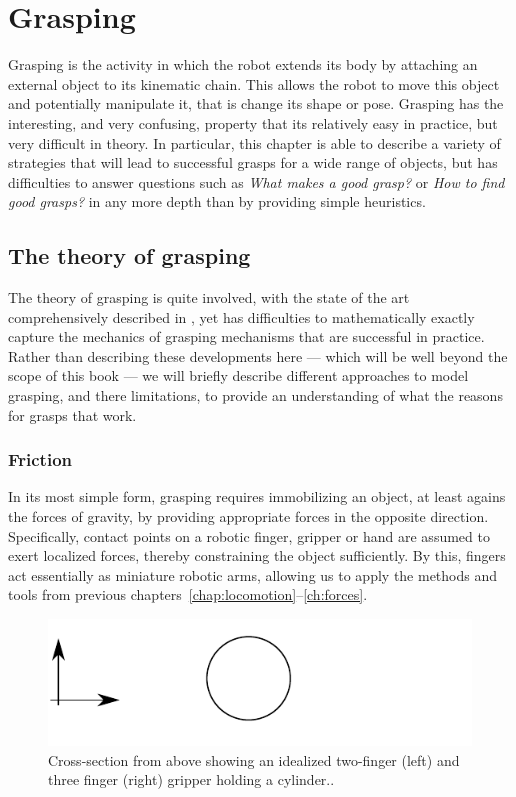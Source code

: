\chapter{Grasping}
Grasping is the activity in which the robot extends its body by attaching an external object to its kinematic chain. This allows the robot to move this object and potentially manipulate it, that is change its shape or pose. Grasping has the interesting, and very confusing, property that its relatively easy in practice, but very difficult in theory. In particular, this chapter is able to describe a variety of strategies that will lead to successful grasps for a wide range of objects, but has difficulties to answer questions such as \emph{What makes a good grasp?} or \emph{How to find good grasps?} in any more depth than by providing simple heuristics.

\section{The theory of grasping}
The theory of grasping is quite involved, with the state of the art comprehensively described in \cite{rimon2019mechanics}, yet has difficulties to mathematically exactly capture the mechanics of grasping mechanisms that are successful in practice. Rather than describing these developments here --- which will be well beyond the scope of this book --- we will briefly describe different approaches to model grasping, and there limitations, to provide an understanding of what the reasons for grasps that work.

\subsection{Friction}
In its most simple form, grasping requires immobilizing an object, at least agains the forces of gravity, by providing appropriate forces in the opposite direction. Specifically, contact points on a robotic finger, gripper or hand are assumed to exert localized forces, thereby constraining the object sufficiently. By this, fingers act essentially as miniature robotic arms, allowing us to apply the methods and tools from previous chapters~\ref{chap:locomotion}--\ref{ch:forces}.


\begin{figure}
\includegraphics[width=\columnwidth]{figs/idealgrasp}
\caption{Cross-section from above showing an idealized two-finger (left) and three finger (right) gripper holding a cylinder.\label{fig:idealgrasp}.}
\end{figure}

